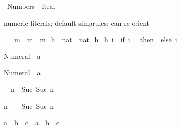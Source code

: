 %
\begin{isabellebody}%
\def\isabellecontext{Numbers}%
\isanewline
{}\ Numbers\ {\isacharequal}\ Real{\isacharcolon}\isanewline
\isanewline
\isamarkupfalse%
\isamarkupfalse%
\isamarkupfalse%
%
\begin{isamarkuptext}%
numeric literals; default simprules; can re-orient%
\end{isamarkuptext}%
\isamarkuptrue%
\ {\isachardoublequote}{}\ {\isacharasterisk}\ m\ {\isacharequal}\ m\ {\isacharplus}\ m{\isachardoublequote}\isamarkupfalse%
\isamarkuptrue%
\isanewline
\isanewline
\isamarkupfalse%
\ h\ {\isacharcolon}{\isacharcolon}\ {\isachardoublequote}nat\ {\isasymRightarrow}\ nat{\isachardoublequote}\isanewline
\isamarkupfalse%
\ h\ {\isachardoublequote}{\isacharbraceleft}{\isacharbraceright}{\isachardoublequote}\isanewline
{\isachardoublequote}h\ i\ {\isacharequal}\ {\isacharparenleft}if\ i\ {\isacharequal}\ {}\ then\ {}\ else\ i{\isacharparenright}{\isachardoublequote}\isamarkupfalse%
%
\begin{isamarkuptext}%
%
\end{isamarkuptext}%
\isamarkuptrue%
%
\begin{isamarkuptext}%
\begin{isabelle}%
Numeral{}\ {\isacharequal}\ {\isacharparenleft}{}{\isasymColon}{\isacharprime}a{\isacharparenright}%
\end{isabelle}

\begin{isabelle}%
Numeral{}\ {\isacharequal}\ {\isacharparenleft}{}{\isasymColon}{\isacharprime}a{\isacharparenright}%
\end{isabelle}

\begin{isabelle}%
{}\ {\isacharplus}\ n\ {\isacharequal}\ Suc\ {\isacharparenleft}Suc\ n{\isacharparenright}%
\end{isabelle}

\begin{isabelle}%
n\ {\isacharplus}\ {}\ {\isacharequal}\ Suc\ {\isacharparenleft}Suc\ n{\isacharparenright}%
\end{isabelle}

\begin{isabelle}%
a\ {\isacharplus}\ b\ {\isacharplus}\ c\ {\isacharequal}\ a\ {\isacharplus}\ {\isacharparenleft}b\ {\isacharplus}\ c{\isacharparenright}%
\end{isabelle}


\end{isamarkuptext}
\end{isabellebody}

